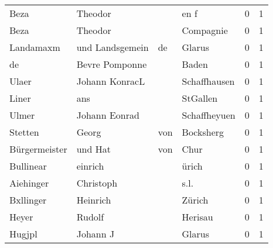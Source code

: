 \documentclass[10pt,a4paper,landscape]{article}
\begin{document}
\begin{longtable}{llllrr}
                     Beza &                            Theodor &             &                                        en f &          0 &         1 \\
                     Beza &                            Theodor &             &                                   Compagnie &          0 &         1 \\
                Landamaxm &                    und Landsgemein &          de &                                      Glarus &          0 &         1 \\
                       de &                     Bevre Pomponne &             &                                       Baden &          0 &         1 \\
                    Ulaer &                     Johann KonracL &             &                                Schaffhausen &          0 &         1 \\
                    Liner &                                ans &             &                                    StGallen &          0 &         1 \\
                    Ulmer &                      Johann Eonrad &             &                                Schaffheyuen &          0 &         1 \\
                  Stetten &                              Georg &         von &                                   Bocksherg &          0 &         1 \\
            Bürgermeister &                            und Hat &         von &                                        Chur &          0 &         1 \\
                Bullinear &                            einrich &             &                                       ürich &          0 &         1 \\
                Aiehinger &                          Christoph &             &                                        s.l. &          0 &         1 \\
                Bxllinger &                           Heinrich &             &                                      Zürich &          0 &         1 \\
                    Heyer &                             Rudolf &             &                                     Herisau &          0 &         1 \\
                   Hugjpl &                           Johann J &             &                                      Glarus &          0 &         1 \\

\end{longtable}
\end{document}
